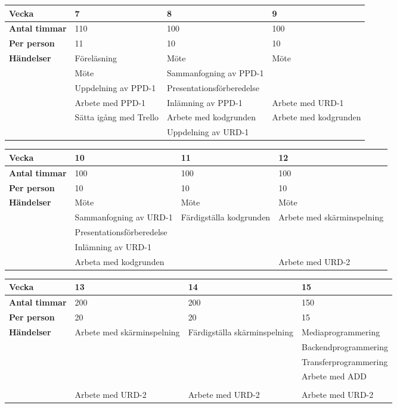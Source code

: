 \begin{tabular}{ | p{65pt} || p{110pt} | p{110pt} | p{110pt} |}
  \hline
  \textbf{Vecka} & 7 & 8 & 9  \\ \hline
  \textbf{Antal timmar} & 110 & 100 & 100\\ \hline
  \textbf{Per person} & 11 & 10 & 10\\ \hline
  \textbf{Händelser} & Föreläsning & Möte & Möte\\ \hline
  & Möte & Sammanfogning av PPD-1 &\\ \hline
  & Uppdelning av PPD-1 & Presentationsförberedelse &  \\ \hline
  & Arbete med PPD-1 & Inlämning av PPD-1 & Arbete med URD-1 \\ \hline
  & Sätta igång med Trello & Arbete med kodgrunden & Arbete med kodgrunden \\ \hline
& & Uppdelning av URD-1 & \\ \hline
\end{tabular}

\begin{tabular}{ | p{65pt} || p{110pt} | p{110pt} | p{110pt} |}
  \hline
  \textbf{Vecka} & 10 & 11 & 12  \\ \hline
  \textbf{Antal timmar} & 100 & 100 & 100 \\ \hline
  \textbf{Per person} & 10 & 10 & 10 \\ \hline
  \textbf{Händelser} & Möte & Möte & Möte\\ \hline
  & Sammanfogning av URD-1 & Färdigställa kodgrunden & Arbete med skärminspelning\\ \hline
  & Presentationsförberedelse &  &  \\ \hline
  & Inlämning av URD-1 &  &  \\ \hline
  & Arbeta med kodgrunden &  & Arbete med URD-2 \\ \hline
\end{tabular}

\begin{tabular}{ | p{65pt} || p{110pt} | p{110pt} | p{110pt} |}
  \hline
  \textbf{Vecka} & 13 & 14 & 15  \\ \hline
  \textbf{Antal timmar} & 200 & 200 & 150 \\ \hline
  \textbf{Per person} & 20 & 20 & 15 \\ \hline
  \textbf{Händelser} & Arbete med skärminspelning & Färdigställa skärminspelning & Mediaprogrammering \\ \hline
  &  &  & Backendprogrammering \\ \hline
  &  &  & Transferprogrammering \\ \hline
  &  &  & Arbete med ADD \\ \hline
  &  &  &  \\ \hline
  & Arbete med URD-2 & Arbete med URD-2 & Arbete med URD-2\\ \hline
\end{tabular}

